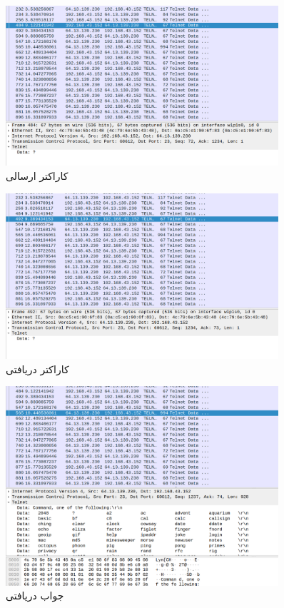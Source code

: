 \documentclass{article}
\begin{document}
\begin{figure}[h!]
	\centering
	\includegraphics[width=0.9\textwidth]{src/telnetcharsend.png}
	\caption{
		کاراکتر ارسالی
	}
	\label{fig:telnetcharsend}
\end{figure}
\begin{figure}[h!]
	\centering
	\includegraphics[width=0.9\textwidth]{src/telnetcharrec.png}
	\caption{
		کاراکتر دریافتی
	}
	\label{fig:telnetcharrec}
\end{figure}
\begin{figure}[h!]
	\centering
	\includegraphics[width=0.9\textwidth]{src/telhelpcharresp.png}
	\caption{
		جواب دریافتی
	}
	\label{fig:telhelpcharresp}
\end{figure}
\end{document}
